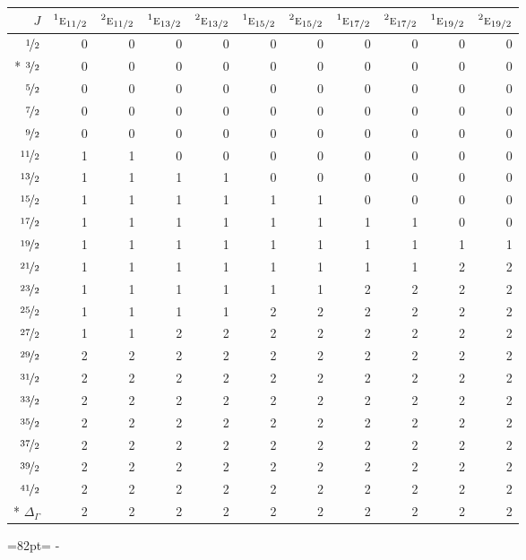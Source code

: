 \documentclass[10pt,a4paper]{article}
\makeatletter
\def\grouprule#1#2{\noalign{\marks\LTgroupmarks{\the\belowrulesep}\nobreak\vskip#1%
  \vskip\aboverulesep}\multispan\LT@cols\unskip{\leaders\hrule\@height#2\hfill\kern\z@}\cr
  \noalign{\penalty\LTrulebreak\vskip\belowrulesep\global\@lastruleclass\z@}}
\newcommand{\needspace}[1]{\par\penalty-100\begingroup\dimen0=#1\relax\dimen2=\pagegoal
  \advance\dimen2-\pagetotal\ifdim\dimen0>\dimen2\relax\ifdim\dimen2>0pt\vfil\break\fi\fi
  \endgroup}
\numberwithin{equation}{section}
\newcommand{\irr}[1]{\text{\normalfont\scshape #1}}
\newcommand{\conjpair}[1]{{}^{#1}}
\makeatother
\begin{document}
{\small\begin{longtable}{@{}rrrrrrrrrrr@{}}\toprule
$J$ & $\conjpair{1}\irr{e}_{11/2}$ & $\conjpair{2}\irr{e}_{11/2}$ & $\conjpair{1}\irr{e}_{13/2}$ & $\conjpair{2}\irr{e}_{13/2}$ & $\conjpair{1}\irr{e}_{15/2}$ & $\conjpair{2}\irr{e}_{15/2}$ & $\conjpair{1}\irr{e}_{17/2}$ & $\conjpair{2}\irr{e}_{17/2}$ & $\conjpair{1}\irr{e}_{19/2}$ & $\conjpair{2}\irr{e}_{19/2}$\\\midrule\endhead
\bottomrule\endfoot\endlastfoot
$\nicefrac{1}{2}$ & 0 & 0 & 0 & 0 & 0 & 0 & 0 & 0 & 0 & 0\\*
$\nicefrac{3}{2}$ & 0 & 0 & 0 & 0 & 0 & 0 & 0 & 0 & 0 & 0\\
$\nicefrac{5}{2}$ & 0 & 0 & 0 & 0 & 0 & 0 & 0 & 0 & 0 & 0\\
$\nicefrac{7}{2}$ & 0 & 0 & 0 & 0 & 0 & 0 & 0 & 0 & 0 & 0\\
$\nicefrac{9}{2}$ & 0 & 0 & 0 & 0 & 0 & 0 & 0 & 0 & 0 & 0\\
$\nicefrac{11}{2}$ & 1 & 1 & 0 & 0 & 0 & 0 & 0 & 0 & 0 & 0\\
$\nicefrac{13}{2}$ & 1 & 1 & 1 & 1 & 0 & 0 & 0 & 0 & 0 & 0\\
$\nicefrac{15}{2}$ & 1 & 1 & 1 & 1 & 1 & 1 & 0 & 0 & 0 & 0\\
$\nicefrac{17}{2}$ & 1 & 1 & 1 & 1 & 1 & 1 & 1 & 1 & 0 & 0\\
$\nicefrac{19}{2}$ & 1 & 1 & 1 & 1 & 1 & 1 & 1 & 1 & 1 & 1\\
$\nicefrac{21}{2}$ & 1 & 1 & 1 & 1 & 1 & 1 & 1 & 1 & 2 & 2\\
$\nicefrac{23}{2}$ & 1 & 1 & 1 & 1 & 1 & 1 & 2 & 2 & 2 & 2\\
$\nicefrac{25}{2}$ & 1 & 1 & 1 & 1 & 2 & 2 & 2 & 2 & 2 & 2\\
$\nicefrac{27}{2}$ & 1 & 1 & 2 & 2 & 2 & 2 & 2 & 2 & 2 & 2\\
$\nicefrac{29}{2}$ & 2 & 2 & 2 & 2 & 2 & 2 & 2 & 2 & 2 & 2\\
$\nicefrac{31}{2}$ & 2 & 2 & 2 & 2 & 2 & 2 & 2 & 2 & 2 & 2\\
$\nicefrac{33}{2}$ & 2 & 2 & 2 & 2 & 2 & 2 & 2 & 2 & 2 & 2\\
$\nicefrac{35}{2}$ & 2 & 2 & 2 & 2 & 2 & 2 & 2 & 2 & 2 & 2\\
$\nicefrac{37}{2}$ & 2 & 2 & 2 & 2 & 2 & 2 & 2 & 2 & 2 & 2\\
$\nicefrac{39}{2}$ & 2 & 2 & 2 & 2 & 2 & 2 & 2 & 2 & 2 & 2\\
$\nicefrac{41}{2}$ & 2 & 2 & 2 & 2 & 2 & 2 & 2 & 2 & 2 & 2\\*
\grouprule{0pt}{\lightrulewidth} $\Delta_\Gamma$ & 2 & 2 & 2 & 2 & 2 & 2 & 2 & 2 & 2 & 2\\
\bottomrule\end{longtable}}
\needspace{82pt}
\end{document}
